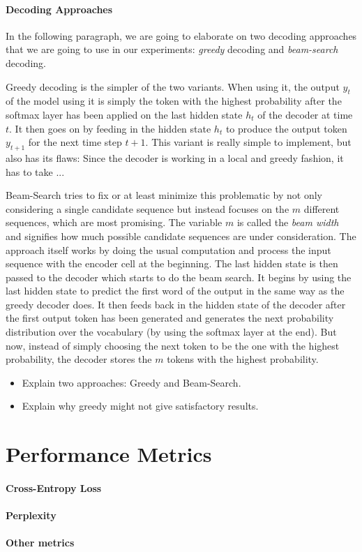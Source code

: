 \paragraph{Decoding Approaches} In the following paragraph, we are going to elaborate on two decoding approaches that we are going to use in our experiments: \emph{greedy} decoding and \emph{beam-search} decoding.

Greedy decoding is the simpler of the two variants. When using it, the output $y_t$ of the model using it is simply the token with the highest probability after the softmax layer has been applied on the last hidden state $h_t$ of the decoder at time $t$. It then goes on by feeding in the hidden state $h_t$ to produce the output token $y_{t+1}$ for the next time step $t+1$. This variant is really simple to implement, but also has its flaws: Since the decoder is working in a local and greedy fashion, it has to take ...

Beam-Search tries to fix or at least minimize this problematic by not only considering a single candidate sequence but instead focuses on the $m$ different sequences, which are most promising. The variable $m$ is called the \emph{beam width} and signifies how much possible candidate sequences are under consideration. The approach itself works by doing the usual computation and process the input sequence with the encoder cell at the beginning. The last hidden state is then passed to the decoder which starts to do the beam search. It begins by using the last hidden state to predict the first word of the output in the same way as the greedy decoder does. It then feeds back in the hidden state of the decoder after the first output token has been generated and generates the next probability distribution over the vocabulary (by using the softmax layer at the end). But now, instead of simply choosing the next token to be the one with the highest probability, the decoder stores the $m$ tokens with the highest probability.

\begin{itemize}
	\item Explain two approaches: Greedy and Beam-Search.
	\item Explain why greedy might not give satisfactory results.
\end{itemize}

\section{Performance Metrics}
\paragraph{Cross-Entropy Loss} \blindtext
\paragraph{Perplexity} \blindtext
\paragraph{Other metrics} \blindtext
